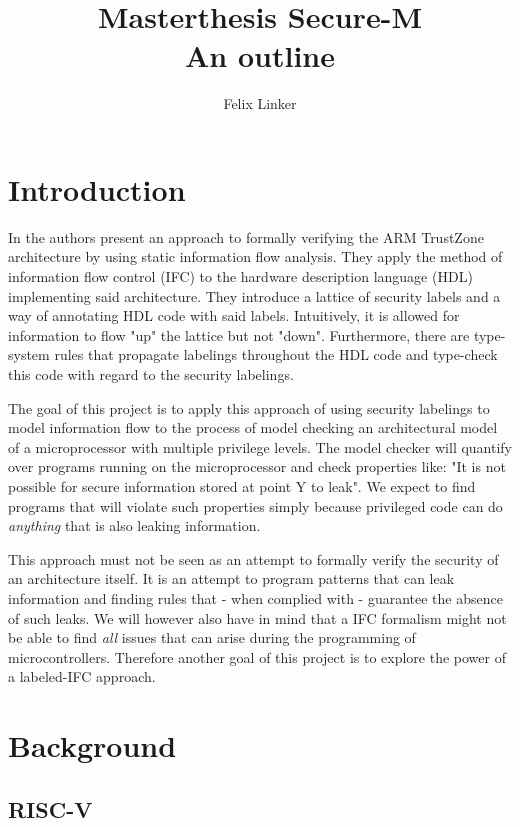 \documentclass{securem}
\title{Masterthesis Secure-M \\ \large{An outline}}
\author{Felix Linker}
\date{}
\begin{document}
\maketitle

\section{Introduction}

In \cite{Ferraiuolo17} the authors present an approach to formally verifying the ARM TrustZone architecture by using static information flow analysis.
They apply the method of information flow control (IFC) to the hardware description language (HDL) implementing said architecture.
They introduce a lattice of security labels and a way of annotating HDL code with said labels.
Intuitively, it is allowed for information to flow "up" the lattice but not "down".
Furthermore, there are type-system rules that propagate labelings throughout the HDL code and type-check this code with regard to the security labelings.

The goal of this project is to apply this approach of using security labelings to model information flow to the process of model checking an architectural model of a microprocessor with multiple privilege levels.
The model checker will quantify over programs running on the microprocessor and check properties like: "It is not possible for secure information stored at point Y to leak".
We expect to find programs that will violate such properties simply because privileged code can do \textit{anything} that is also leaking information.

This approach must not be seen as an attempt to formally verify the security of an architecture itself.
It is an attempt to program patterns that can leak information and finding rules that - when complied with - guarantee the absence of such leaks.
We will however also have in mind that a IFC formalism might not be able to find \textit{all} issues that can arise during the programming of microcontrollers.
Therefore another goal of this project is to explore the power of a labeled-IFC approach.

\section{Background}

\subsection{RISC-V}
\end{document}
